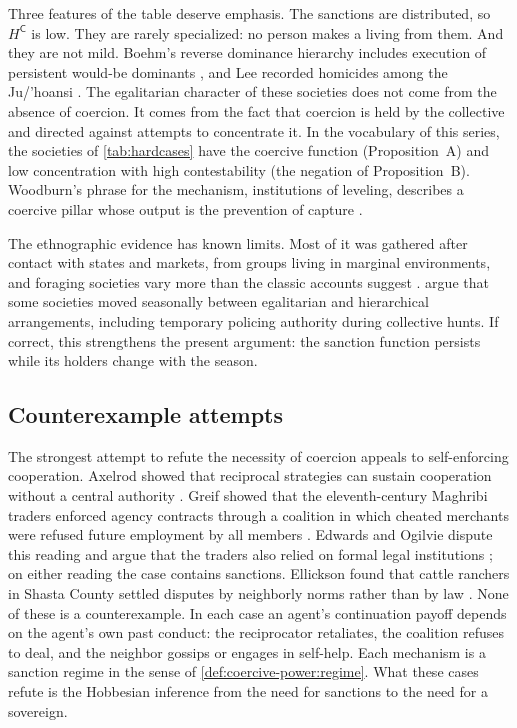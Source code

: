 \documentclass[11pt,letterpaper]{article}
\theoremstyle{definition}
\theoremstyle{remark}
\newcommand{\pC}{\mathsf{C}}
\begin{document}
Three features of the table deserve emphasis. The sanctions are distributed, so $H^{\pC}$ is low. They are rarely specialized: no person makes a living from them. And they are not mild. Boehm's reverse dominance hierarchy includes execution of persistent would-be dominants \citep{boehm1999}, and Lee recorded homicides among the Ju/'hoansi \citep{lee1979}. The egalitarian character of these societies does not come from the absence of coercion. It comes from the fact that coercion is held by the collective and directed against attempts to concentrate it. In the vocabulary of this series, the societies of \cref{tab:hardcases} have the coercive function (Proposition~A) and low concentration with high contestability (the negation of Proposition~B). Woodburn's phrase for the mechanism, institutions of leveling, describes a coercive pillar whose output is the prevention of capture \citep{woodburn1982}.

The ethnographic evidence has known limits. Most of it was gathered after contact with states and markets, from groups living in marginal environments, and foraging societies vary more than the classic accounts suggest \citep{kelly1995}. \citet{graeber2021} argue that some societies moved seasonally between egalitarian and hierarchical arrangements, including temporary policing authority during collective hunts. If correct, this strengthens the present argument: the sanction function persists while its holders change with the season.

\subsection{Counterexample attempts}
\label{sec:counter}

The strongest attempt to refute the necessity of coercion appeals to self-enforcing cooperation. Axelrod showed that reciprocal strategies can sustain cooperation without a central authority \citep{axelrod1984}. Greif showed that the eleventh-century Maghribi traders enforced agency contracts through a coalition in which cheated merchants were refused future employment by all members \citep{greif1993}. Edwards and Ogilvie dispute this reading and argue that the traders also relied on formal legal institutions \citep{edwards2012}; on either reading the case contains sanctions. Ellickson found that cattle ranchers in Shasta County settled disputes by neighborly norms rather than by law \citep{ellickson1991}. None of these is a counterexample. In each case an agent's continuation payoff depends on the agent's own past conduct: the reciprocator retaliates, the coalition refuses to deal, and the neighbor gossips or engages in self-help. Each mechanism is a sanction regime in the sense of \cref{def:coercive-power:regime}. What these cases refute is the Hobbesian inference from the need for sanctions to the need for a sovereign.
\end{document}

